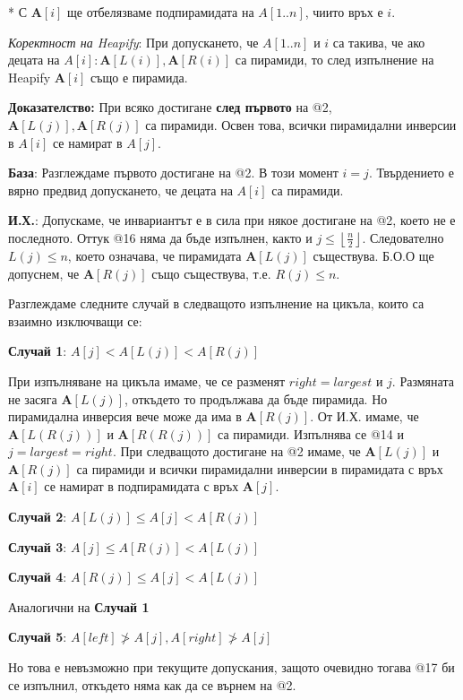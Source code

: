 \documentclass{article}
\renewcommand{\\}{\newline}
\newcommand{\doc}{\textbf{Доказателство: }}
\begin{document}
* С \(\textbf{A}[i]\) ще отбелязваме подпирамидата на \(A[1..n]\), чиито връх е \(i\).

\textit{Коректност на Heapify}: При допускането, че \(A[1..n]\) и  \(i\) са такива, че ако децата на \(A[i]: \textbf{A}[L(i)], \textbf{A}[R(i)]\) са пирамиди, то след изпълнение на Heapify \(\textbf{A}[i]\) също е пирамида.

\doc При всяко достигане \textbf{след първото} на @2, \(\textbf{A}[L(j)], \textbf{A}[R(j)]\) са пирамиди. Освен това, всички пирамидални инверсии в \(A[i]\) се намират в \(A[j]\).

\textbf{База}: Разглеждаме първото достигане на @2. В този момент \(i = j\). Твърдението е вярно предвид допускането, че децата на \(A[i]\) са пирамиди.

\textbf{И.Х.}: Допускаме, че инвариантът е в сила при някое достигане на @2, което не е последното. Оттук @16 няма да бъде изпълнен, както и \(j \leq \left\lfloor \frac{n}{2}\right\rfloor\). Следователно \(L(j) \leq n\), което означава, че пирамидата \(\textbf{A}[L(j)]\) съществува. Б.О.О ще допуснем, че \(\textbf{A}[R(j)]\) също съществува, т.е. \(R(j) \leq n\). 

Разглеждаме следните случай в следващото изпълнение на цикъла, които са взаимно изключващи се: 

\textbf{Случай 1}: \(A[j] < A[L(j)] < A[R(j)]\)

При изпълняване на цикъла имаме, че се разменят \(right = largest\) и \(j\). Размяната не засяга \(\textbf{A}[L(j)]\), откъдето то продължава да бъде пирамида. Но пирамидална инверсия вече може да има в \(\textbf{A}[R(j)]\). От И.Х. имаме, че \(\textbf{A}[L(R(j))]\) и \(\textbf{A}[R(R(j))]\) са пирамиди. Изпълнява се @14 и \(j = largest = right\). При следващото достигане на @2 имаме, че \(\textbf{A}[L(j)]\) и \(\textbf{A}[R(j)]\) са пирамиди и всички пирамидални инверсии в пирамидата с връх \(\textbf{A}[i]\) се намират в подпирамидата с връх \(\textbf{A}[j]\).  

\textbf{Случай 2}: \(A[L(j)] \leq A[j] < A[R(j)]\) 

\textbf{Случай 3}: \(A[j] \leq A[R(j)] < A[L(j)]\) 

\textbf{Случай 4}: \(A[R(j)] \leq A[j] < A[L(j)]\) 

Аналогични на \textbf{Случай 1}

\textbf{Случай 5}: \(A[left] \not> A[j], A[right] \not> A[j]\)

Но това е невъзможно при текущите допускания, защото очевидно тогава @17 би се изпълнил, откъдето няма как да се върнем на @2.
\end{document}
